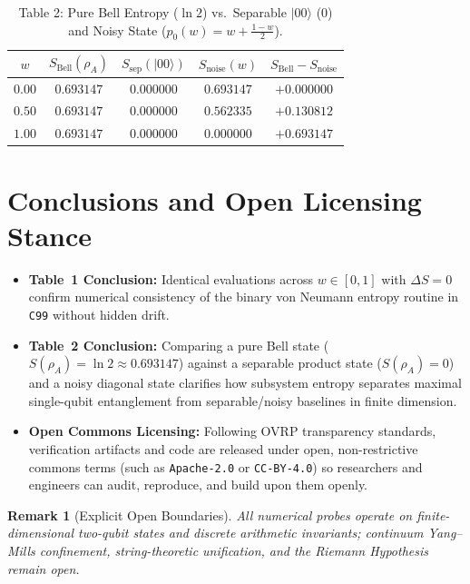 \documentclass[11pt,a4paper]{article}
\newtheorem{remark}{Remark}
\begin{document}
\begin{table}[h!]
\centering
\caption{Table 2: Pure Bell Entropy ($\ln 2$) vs.\ Separable $|00\rangle$ ($0$) and Noisy State ($p_0(w) = w + \frac{1-w}{2}$).}
\begin{tabular}{ccccc}
\hline
$w$ & $S_{\mathrm{Bell}}(\rho_A)$ & $S_{\mathrm{sep}}(|00\rangle)$ & $S_{\mathrm{noise}}(w)$ & $S_{\mathrm{Bell}} - S_{\mathrm{noise}}$ \\
\hline
$0.00$ & $0.693147$ & $0.000000$ & $0.693147$ & $+0.000000$ \\
$0.50$ & $0.693147$ & $0.000000$ & $0.562335$ & $+0.130812$ \\
$1.00$ & $0.693147$ & $0.000000$ & $0.000000$ & $+0.693147$ \\
\hline
\end{tabular}
\end{table}

\section{Conclusions and Open Licensing Stance}
\begin{itemize}
  \item \textbf{Table~1 Conclusion:} Identical evaluations across $w \in [0, 1]$ with $\Delta S = 0$ confirm numerical consistency of the binary von Neumann entropy routine in \texttt{C99} without hidden drift.
  \item \textbf{Table~2 Conclusion:} Comparing a pure Bell state ($S(\rho_A) = \ln 2 \approx 0.693147$) against a separable product state ($S(\rho_A) = 0$) and a noisy diagonal state clarifies how subsystem entropy separates maximal single-qubit entanglement from separable/noisy baselines in finite dimension.
  \item \textbf{Open Commons Licensing:} Following OVRP transparency standards, verification artifacts and code are released under open, non-restrictive commons terms (such as \texttt{Apache-2.0} or \texttt{CC-BY-4.0}) so researchers and engineers can audit, reproduce, and build upon them openly.
\end{itemize}

\begin{remark}[Explicit Open Boundaries]
All numerical probes operate on finite-dimensional two-qubit states and discrete arithmetic invariants; continuum Yang--Mills confinement, string-theoretic unification, and the Riemann Hypothesis remain open.
\end{remark}
\end{document}
